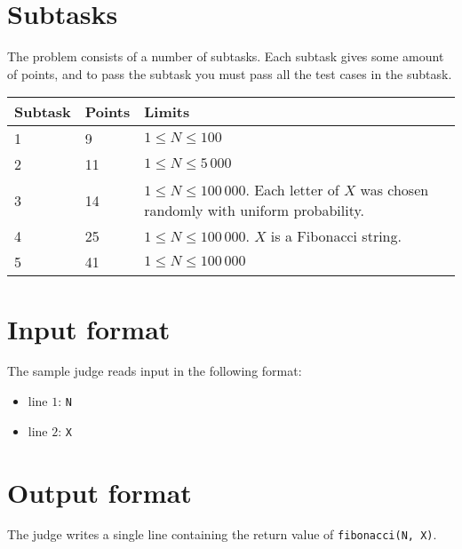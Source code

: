 \section*{Subtasks}
The problem consists of a number of subtasks. Each subtask gives some amount of points, and to pass
the subtask you must pass all the test cases in the subtask.

\begin{tabular}{|l|l|l|}
  \hline
  \textbf{Subtask} & \textbf{Points} & \textbf{Limits} \\ \hline
  1 & 9 & $1 \le N \le 100$  \\ \hline
  2 & 11 & $1 \le N \le 5\,000$  \\ \hline
  3 & 14 & $1 \le N \le 100\,000$. Each letter of $X$ was chosen randomly with uniform probability.  \\ \hline
  4 & 25 & $1 \le N \le 100\,000$. $X$ is a Fibonacci string.  \\ \hline
  5 & 41 & $1 \le N \le 100\,000$  \\ \hline

\end{tabular}

\section*{Input format}
The sample judge reads input in the following format:

\begin{itemize}
  \item line $1$: \texttt{N}
  \item line $2$: \texttt{X}
\end{itemize}

\section*{Output format}
The judge writes a single line containing the return value of \texttt{fibonacci(N, X)}.
